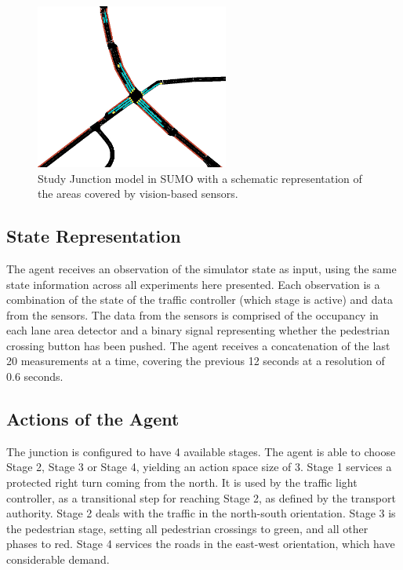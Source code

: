 \documentclass[conference]{IEEEtran}
\begin{document}
\begin{figure}                                                
\centering                                                    
\includegraphics[width=2.5in]{intersection}                                    
\caption{Study Junction model in SUMO with a schematic representation of the areas covered by vision-based sensors.}                                  
\label{intersection}                                               
\end{figure}     

\subsection{State Representation}
The agent receives an observation of the simulator state as input, using the same state information across all experiments here presented.
Each observation is a combination of the state of the traffic controller (which stage is active) and data from the sensors.
The data from the sensors is comprised of the occupancy in each lane area detector and a binary signal representing whether the pedestrian crossing button has been pushed.
The agent receives a concatenation of the last 20 measurements at a time, covering the previous 12 seconds at a resolution of 0.6 seconds.

\subsection{Actions of the Agent}
The junction is configured to have 4 available stages. 
The agent is able to choose Stage 2, Stage 3 or Stage 4, yielding an action space size of 3.
Stage 1 services a protected right turn coming from the north. It is used by the traffic light controller, as a transitional step for reaching Stage 2, as defined by the transport authority.
Stage 2 deals with the traffic in the north-south orientation.
Stage 3 is the pedestrian stage, setting all pedestrian crossings to green, and all other phases to red.
Stage 4 services the roads in the east-west orientation, which have considerable demand.
\end{document}
